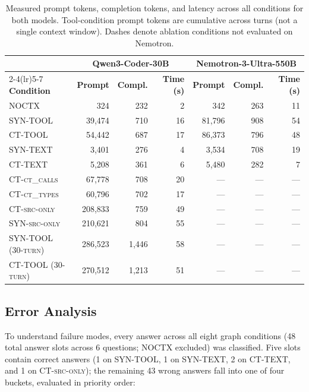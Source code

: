 \begin{table}[h]
\caption{Measured prompt tokens, completion tokens, and latency across all conditions for both models.
  Tool-condition prompt tokens are cumulative across turns (not a single context window).
  Dashes denote ablation conditions not evaluated on Nemotron.}
\label{tab:cost}
\small
\begin{tabular}{lrrr|rrr}
\toprule
 & \multicolumn{3}{c|}{\textbf{Qwen3-Coder-30B}}
 & \multicolumn{3}{c}{\textbf{Nemotron-3-Ultra-550B}} \\
\cmidrule(lr){2-4}\cmidrule(lr){5-7}
\textbf{Condition} & \textbf{Prompt} & \textbf{Compl.} & \textbf{Time (s)}
                   & \textbf{Prompt} & \textbf{Compl.} & \textbf{Time (s)} \\
\midrule
\textsc{NOCTX}             &     324 & 232 &  2 &     342 & 263 & 11 \\
\textsc{SYN-TOOL}           &  39,474 & 710 & 16 &  81,796 & 908 & 54 \\
\textsc{CT-TOOL}            &  54,442 & 687 & 17 &  86,373 & 796 & 48 \\
\textsc{SYN-TEXT}           &   3,401 & 276 &  4 &   3,534 & 708 & 19 \\
\textsc{CT-TEXT}            &   5,208 & 361 &  6 &   5,480 & 282 &  7 \\
\midrule
\textsc{CT-ct\_calls}      &  67,778 & 708 & 20 & --- & --- & --- \\
\textsc{CT-ct\_types}      &  60,796 & 702 & 17 & --- & --- & --- \\
\textsc{CT-src-only}        & 208,833 & 759 & 49 & --- & --- & --- \\
\textsc{SYN-src-only}       & 210,621 & 804 & 55 & --- & --- & --- \\
\midrule
\textsc{SYN-TOOL (30-turn)} & 286,523 & 1,446 & 58 & --- & --- & --- \\
\textsc{CT-TOOL (30-turn)}  & 270,512 & 1,213 & 51 & --- & --- & --- \\
\bottomrule
\end{tabular}
\end{table}

\subsection{Error Analysis}

To understand failure modes, every \qwen{} answer across all eight graph
conditions (48 total answer slots across 6 questions; \textsc{NOCTX} excluded)
was classified.
Five slots contain correct answers (1 on \textsc{SYN-TOOL}, 1 on \textsc{SYN-TEXT},
2 on \textsc{CT-TEXT}, and 1 on \textsc{CT-src-only}); the remaining 43 wrong answers
fall into one of four buckets, evaluated in priority order:

